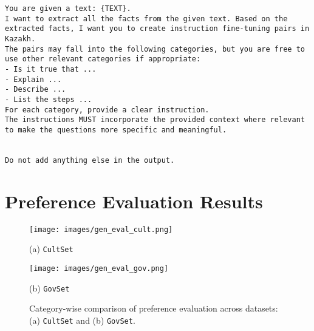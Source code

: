 \begin{lstlisting}[basicstyle=\ttfamily\scriptsize, breaklines=true, aboveskip=0pt, belowskip=0pt, lineskip=-2pt, xleftmargin=0pt]
You are given a text: {TEXT}.
I want to extract all the facts from the given text. Based on the extracted facts, I want you to create instruction fine-tuning pairs in Kazakh. 
The pairs may fall into the following categories, but you are free to use other relevant categories if appropriate:
- Is it true that ...
- Explain ...
- Describe ...
- List the steps ...
For each category, provide a clear instruction.
The instructions MUST incorporate the provided context where relevant to make the questions more specific and meaningful.


Do not add anything else in the output.
\end{lstlisting}
\onecolumn
\clearpage
\section{Preference Evaluation Results}
\label{app:preference-category-eval-results}

\begin{figure*}[htp]
    \centering
    \begin{minipage}{1\textwidth}
        \centering
        \texttt{[image: images/gen\_eval\_cult.png]}
        \caption*{(a) \texttt{CultSet}}
    \end{minipage}
    
    \begin{minipage}{1\textwidth}
        \centering
        \texttt{[image: images/gen\_eval\_gov.png]}
        \caption*{(b) \texttt{GovSet}}
    \end{minipage}

    \caption{Category-wise comparison of preference evaluation across datasets: (a) \texttt{CultSet} and (b) \texttt{GovSet}.}
    \label{fig:category-wise-eval}
\end{figure*}


\clearpage
\onecolumn

